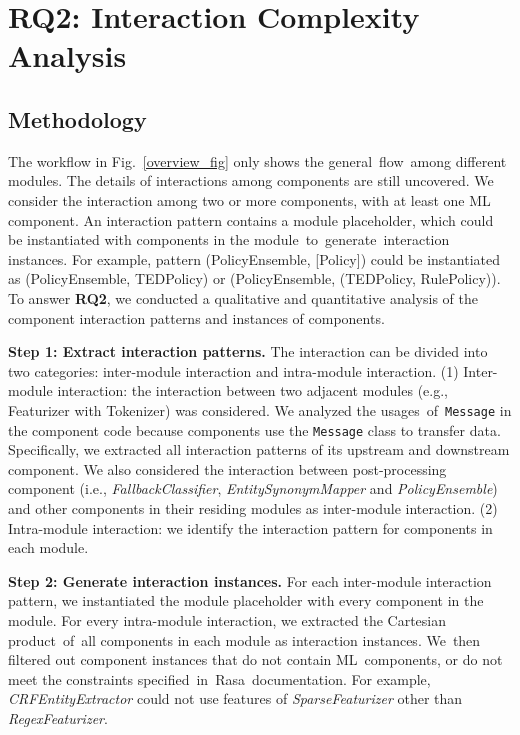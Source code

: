 
\section{RQ2: Interaction Complexity Analysis}
\vspace{-3pt}
\subsection{Methodology}

The workflow in Fig.~\ref{overview_fig} only shows the general~flow~among different modules. The details of interactions among components are still uncovered. We consider the interaction among two or more components, with at least one ML component.
An interaction pattern contains a module placeholder, which could be instantiated with components in the module~to~generate~interaction instances.
For example, pattern (PolicyEnsemble, [Policy]) could be instantiated as (PolicyEnsemble, TEDPolicy) or (PolicyEnsemble, (TEDPolicy, RulePolicy)). To answer \textbf{RQ2}, we conducted a qualitative and quantitative analysis of the component interaction patterns and instances of components.

\textbf{Step 1: Extract interaction patterns.}
The interaction can be divided into two categories: inter-module interaction and intra-module interaction.
(1) Inter-module interaction: the interaction between two adjacent modules (e.g., Featurizer with Tokenizer) was considered. We analyzed the usages~of~\texttt{Message} in the component code because components use the \texttt{Message} class to transfer data. Specifically, we extracted all interaction patterns of its upstream and downstream component. We also considered the interaction between post-processing component (i.e., \textit{FallbackClassifier}, \textit{EntitySynonymMapper} and \textit{PolicyEnsemble}) and other components in their residing modules as inter-module interaction.
(2) Intra-module interaction: we identify the interaction pattern for components in each module.

\textbf{Step 2: Generate interaction instances.}
For each inter-module interaction pattern, we instantiated the module placeholder with every component in the module. 
For every intra-module interaction, we extracted the Cartesian product~of~all components in each module as interaction instances.
We~then filtered out component instances that do not contain ML~components, or do not meet the constraints specified~in~Rasa~documentation. 
For example, \textit{CRFEntityExtractor} could not use features of \textit{SparseFeaturizer} other than \textit{RegexFeaturizer}.

